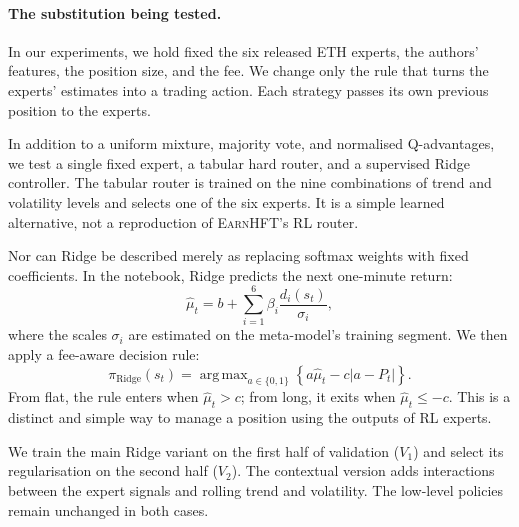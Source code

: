 \documentclass[9pt,a4paper,twocolumn]{extarticle}
\newcommand{\Earn}{\textsc{EarnHFT}}
\DeclareMathOperator*{\argmax}{arg\,max}
\begin{document}
\paragraph{The substitution being tested.}

In our experiments, we hold fixed the six released ETH experts, the authors' features, the
position size, and the fee. We change only the rule that turns the experts' estimates into a
trading action. Each strategy passes its own previous position to the experts.

In addition to a uniform mixture, majority vote, and normalised Q-advantages, we test a single
fixed expert, a tabular hard router, and a supervised Ridge controller. The tabular router is
trained on the nine combinations of trend and volatility levels and selects one of the six
experts. It is a simple learned alternative, not a reproduction of \Earn{}'s RL router.

Nor can Ridge be described merely as replacing softmax weights with fixed coefficients. In the
notebook, Ridge predicts the next one-minute return:
\begin{equation}
  \widehat{\mu}_t
  =
  b+\sum_{i=1}^{6}
  \beta_i\frac{d_i(s_t)}{\sigma_i},
  \label{eq:ridge_forecast}
\end{equation}
where the scales $\sigma_i$ are estimated on the meta-model's training segment. We then apply a
fee-aware decision rule:
\begin{equation}
  \pi_{\mathrm{Ridge}}(s_t)
  =
  \argmax_{a\in\{0,1\}}
  \left\{
    a\widehat{\mu}_t
    -c|a-P_t|
  \right\}.
  \label{eq:ridge_policy}
\end{equation}
From flat, the rule enters when $\widehat{\mu}_t>c$; from long, it exits when
$\widehat{\mu}_t\leq-c$. This is a distinct and simple way to manage a position using the outputs
of RL experts.

We train the main Ridge variant on the first half of validation ($V_1$) and select its
regularisation on the second half ($V_2$). The contextual version adds interactions between the
expert signals and rolling trend and volatility. The low-level policies remain unchanged in both
cases.
\end{document}

